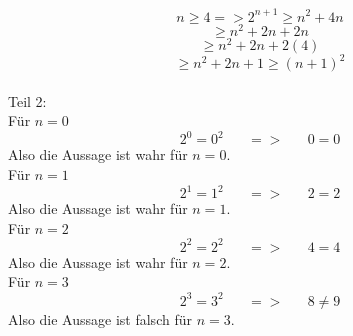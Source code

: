 \documentclass[11pt]{article}
\begin{document}
					$$n\geq4 => 2^{n+1} \geq n^2+4n$$
					$$\geq n^2 + 2n + 2n$$
					$$\geq n^2 + 2n + 2(4)$$
					$$\geq n^2 + 2n + 1 \geq (n+1)^2$$\\
				Teil 2:\\
				Für $n=0$	\\
				$$2^0=0^2 \hspace{20pt} => \hspace{20pt} 0=0$$
				Also die Aussage ist wahr für $n=0$.\\
				Für $n=1$	\\
				$$2^1=1^2 \hspace{20pt} => \hspace{20pt} 2=2$$
				Also die Aussage ist wahr für $n=1$.\\
				Für $n=2$	\\
				$$2^2=2^2 \hspace{20pt} => \hspace{20pt} 4=4$$
				Also die Aussage ist wahr für $n=2$.\\
				Für $n=3$	\\
				$$2^3=3^2 \hspace{20pt} => \hspace{20pt} 8 \neq 9$$
				Also die Aussage ist falsch für $n=3$.\\
				
\end{document}
